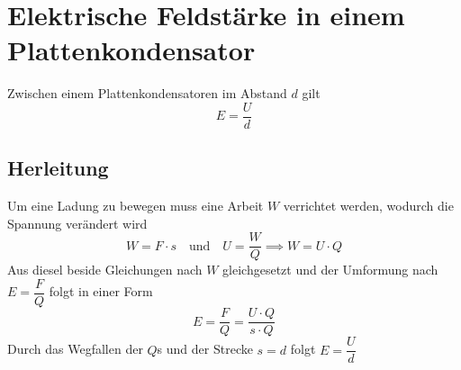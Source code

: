 \documentclass{article}
\begin{document}
\section{Elektrische Feldstärke in einem Plattenkondensator} 
Zwischen einem Plattenkondensatoren im Abstand $d$ gilt
\[
 E=\frac{U}{d} 
\]
 
\subsection{Herleitung}
Um eine Ladung zu bewegen muss eine Arbeit $W$ verrichtet werden, wodurch die Spannung verändert wird
\[
 W=F \cdot s
 \quad \text{und} \quad 
 U = \frac{W}{Q} \implies W = U \cdot Q 
\]
Aus diesel beside Gleichungen nach $W$ gleichgesetzt und der Umformung nach $E = \dfrac{F}{Q}$ folgt in einer Form
\[
  E = \frac{F}{Q} = \frac{U \cdot Q}{s \cdot Q}
\]
Durch das Wegfallen der $Q$s und der Strecke $s=d$ folgt $E = \dfrac{U}{d}$
\end{document}
